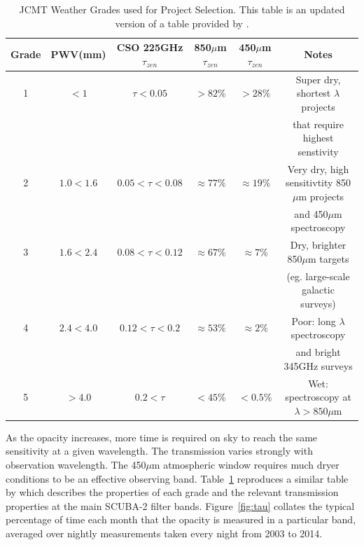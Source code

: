 \documentclass[]{spie}  %
\begin{document}
\begin{table}
\caption{JCMT Weather Grades used for Project Selection. This table is an updated version of a table provided by \cite{robson2002}.}
\label{tab:grades}
\begin{center}
\begin{tabular}{|c|c|c|c|c|c|}
\hline
\rule[-1ex]{0pt}{3.5ex}  Grade & PWV(mm) & CSO 225GHz $\tau_{zen}$ & 850$\mu$m $\tau_{zen}$ & 450$\mu$m $\tau_{zen}$ & Notes  \\
\hline
\rule[-1ex]{0pt}{3.5ex}  1 & $< 1$ & $\tau<0.05$ & $> 82\%$ &   $ > 28\%$& Super dry, shortest $\lambda$ projects\\&&&&& that require highest senstivity\\
\hline
\rule[-1ex]{0pt}{3.5ex}  2 & $1.0 < 1.6$ & $0.05<\tau<0.08$ &  $ \approx77\%$ & $\approx19\%$ &Very dry, high sensitivtity 850$\mu$m projects\\&&&&& and 450$\mu$m spectroscopy\\
\hline
\rule[-1ex]{0pt}{3.5ex}  3 & $1.6 < 2.4$  & $0.08<\tau<0.12$ &  $\approx67\%$ & $\approx7\%$ & Dry, brighter 850$\mu$m targets\\ &&&&&(eg. large-scale galactic surveys)\\
\hline
\rule[-1ex]{0pt}{3.5ex}  4 & $2.4 < 4.0$ & $0.12<\tau<0.2$ &  $\approx53\%$ & $\approx2\%$ & Poor: long $\lambda$ spectroscopy \\&&&&&and bright 345GHz surveys\\
\hline
\rule[-1ex]{0pt}{3.5ex}  5 & $ > 4.0 $ & $0.2<\tau$ & $ < 45\%$ & $< 0.5\%$&  Wet: spectroscopy at $\lambda > 850 \mu$m \\
\hline

\end{tabular}
\end{center}
\end{table}

As the opacity increases, more time is required on sky to reach the
same sensitivity at a given wavelength. The transmission varies
strongly with observation wavelength. The 450$\mu$m atmospheric window
requires much dryer conditions to be an effective observing
band. Table~\ref{tab:grades} reproduces a similar table by
\cite{robson2002} which describes the properties of each grade and the
relevant transmission properties at the main SCUBA-2 filter
bands. Figure~\ref{fig:tau} collates the typical percentage of time
each month that the opacity is measured in a particular band, averaged
over nightly measurements taken every night from 2003 to 2014.
\end{document}
